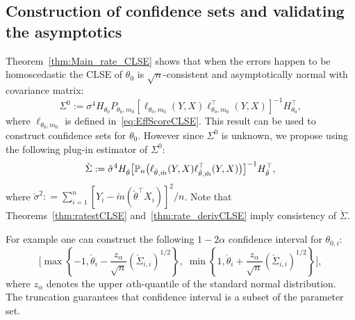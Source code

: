 { \subsection{Construction of confidence sets and validating the asymptotics}\label{sec:cfd_set}
Theorem~\ref{thm:Main_rate_CLSE} shows that when the errors happen to be homoscedastic the CLSE of $\theta_0$ is $\sqrt{n}$-consistent and asymptotically normal with covariance matrix:
\begin{equation}\label{eq:finite_var}
\Sigma^0:= \sigma^4 H_{\theta_0} P_{\theta_0,m_0}[ {\ell}_{\theta_0,m_0}(Y,X) {\ell}^\top_{\theta_0,m_0}(Y,X)]^{-1} H_{\theta_0}^\top,
\end{equation}
where $\ell_{\theta_0, m_0}$ is defined in~\eqref{eq:EffScoreCLSE}. This result can be used to construct confidence sets for $\theta_0.$ However since $\Sigma^0$ is unknown, we propose using the following plug-in estimator of $\Sigma^0$:
\begin{equation}\label{eq:V_hat}
\check{\Sigma} := \check{\sigma}^4 H_{\check{\theta}} \big[\mathbb{P}_n\big( {\ell}_{\check{\theta},\check{m}}(Y,X) {\ell}^\top_{\check{\theta},\check{m}}(Y,X)\big)\big]^{-1} H_{\check{\theta}}^\top,
\end{equation}
where $\check{\sigma}^2: =  \sum_{i=1}^n [Y_i-\check{m}(\check{\theta}^\top X_i)]^2/n$. Note that Theorems~\ref{thm:ratestCLSE} and~\ref{thm:rate_derivCLSE} imply consistency of $\check\Sigma$.

 For example one can construct the following $1-2\alpha$ confidence interval for $\theta_{0,i}$:
\begin{equation}\label{eq:Conf_int}
\bigg[\max \left\{-1, \check{\theta}_i - \frac{z_{\alpha}}{\sqrt{n}} \left(\check{\Sigma}_{i,i}\right)^{1/2}\right\} ,\; \min\left\{1, \check{\theta}_i  + \frac{z_{\alpha}}{\sqrt{n}} \left(\check{\Sigma}_{i,i}\right)^{1/2} \right\}\bigg],
\end{equation}
where $z_{\alpha}$ denotes the upper $\alpha$th-quantile of the standard normal distribution. The truncation guarantees that confidence interval is a subset of the parameter set. 

}
